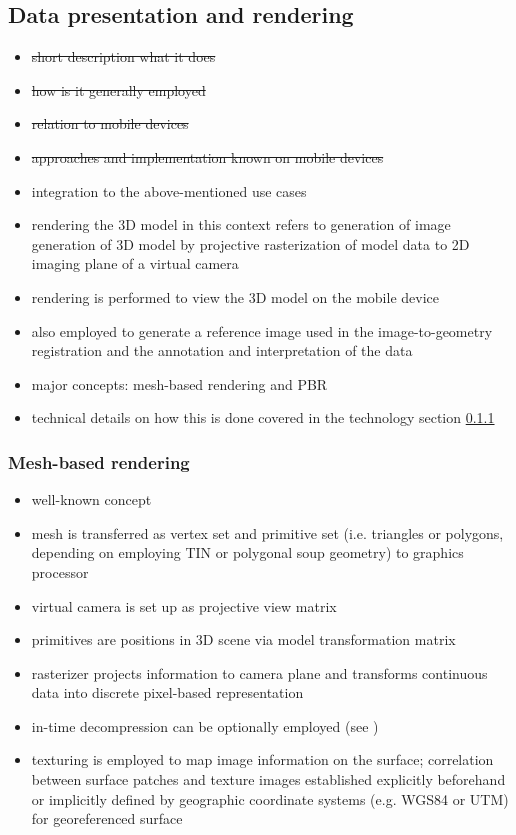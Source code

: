 \documentclass[review]{elsarticle}
\begin{document}
\subsection{Data presentation and rendering}

\begin{itemize}
\item \sout{short description what it does}
\item \sout{how is it generally employed}
\item \sout{relation to mobile devices}
\item \sout{approaches and implementation known on mobile devices}
\item integration to the above-mentioned use cases
\end{itemize}

\begin{itemize}
\item rendering the 3D model in this context refers to generation of image generation of 3D model by projective rasterization of model data to 2D imaging plane of a virtual camera
\item rendering is performed to view the 3D model on the mobile device
\item also employed to generate a reference image used in the image-to-geometry registration and the annotation and interpretation of the data
\item major concepts: mesh-based rendering and \gls{PBR}
\item technical details on how this is done covered in the technology section \ref{}
\end{itemize}

\subsubsection{Mesh-based rendering}

\begin{itemize}
\item well-known concept
\item mesh is transferred as vertex set and primitive set (i.e. triangles or polygons, depending on employing \gls{TIN} or polygonal soup geometry) to graphics processor
\item virtual camera is set up as projective view matrix
\item primitives are positions in 3D scene via model transformation matrix
\item rasterizer projects information to camera plane and transforms continuous data into discrete pixel-based representation
\item in-time decompression can be optionally employed (see \cite{BorgeatXYZ})
\item texturing is employed to map image information on the surface; correlation between surface patches and texture images established explicitly beforehand or implicitly defined by geographic coordinate systems (e.g. WGS84 or UTM) for georeferenced surface
\end{itemize}
\end{document}
